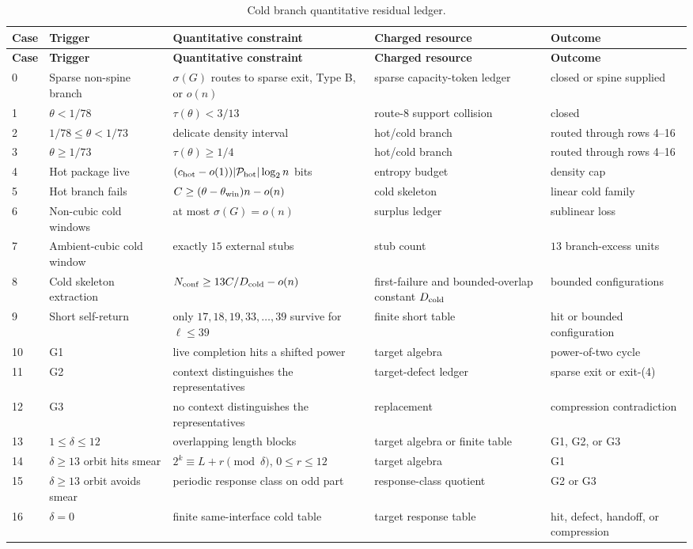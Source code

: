 \documentclass[11pt]{article}
\begin{document}
\begin{longtable}{C{0.05\textwidth} L{0.22\textwidth} L{0.22\textwidth} L{0.20\textwidth} L{0.21\textwidth}}
\caption{Cold branch quantitative residual ledger.}\label{tab:cold-branch-ledger}\\
\toprule
\textbf{Case} & \textbf{Trigger} & \textbf{Quantitative constraint} & \textbf{Charged resource} & \textbf{Outcome} \\
\midrule
\endfirsthead
\toprule
\textbf{Case} & \textbf{Trigger} & \textbf{Quantitative constraint} & \textbf{Charged resource} & \textbf{Outcome} \\
\midrule
{} & Sparse non-spine branch & \(\sigma(G)\) routes to sparse exit, Type B, or \(o(n)\) & sparse capacity-token ledger & closed or spine supplied \\
1 & \(\theta<1/78\) & \(\tau(\theta)<3/13\) & route-8 support collision & closed \\
2 & \(1/78\le\theta<1/73\) & delicate density interval & hot/cold branch & routed through rows 4--16 \\
3 & \(\theta\ge1/73\) & \(\tau(\theta)\ge1/4\) & hot/cold branch & routed through rows 4--16 \\
4 & Hot package live & \((c_{\rm hot}-o(1))|\mathcal P_{\rm hot}|\log_2 n\) bits & entropy budget & density cap \\
5 & Hot branch fails & \(C\ge(\theta-\theta_{\rm win})n-o(n)\) & cold skeleton & linear cold family \\
6 & Non-cubic cold windows & at most \(\sigma(G)=o(n)\) & surplus ledger & sublinear loss \\
7 & Ambient-cubic cold window & exactly \(15\) external stubs & stub count & \(13\) branch-excess units \\
8 & Cold skeleton extraction & \(N_{\rm conf}\ge13C/D_{\rm cold}-o(n)\) & first-failure and bounded-overlap constant \(D_{\rm cold}\) & bounded configurations \\
9 & Short self-return & only \(17,18,19,33,\ldots,39\) survive for \(\ell\le39\) & finite short table & hit or bounded configuration \\
10 & G1 & live completion hits a shifted power & target algebra & power-of-two cycle \\
11 & G2 & context distinguishes the representatives & target-defect ledger & sparse exit or exit-\textup{(4)} \\
12 & G3 & no context distinguishes the representatives & replacement & compression contradiction \\
13 & \(1\le\delta\le12\) & overlapping length blocks & target algebra or finite table & G1, G2, or G3 \\
14 & \(\delta\ge13\) orbit hits smear & \(2^k\equiv L+r\pmod\delta\), \(0\le r\le12\) & target algebra & G1 \\
15 & \(\delta\ge13\) orbit avoids smear & periodic response class on odd part & response-class quotient & G2 or G3 \\
16 & \(\delta=0\) & finite same-interface cold table & target response table & hit, defect, handoff, or compression \\
\bottomrule
\end{longtable}
\end{document}
